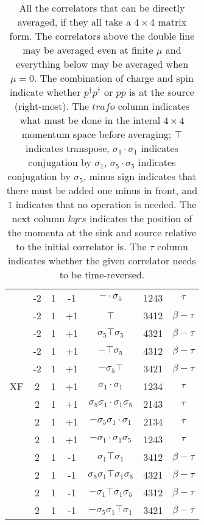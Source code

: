\begin{table}[h]
\begin{tabular}{c|cccccc}
                    & -2 & 1 & -1 & $-\cdot\sigma_5$ & 1243 &  $\tau$  \\
                    & -2 & 1 & +1 & $\top$ & 3412 &  $\beta-\tau$  \\
                    & -2 & 1 & +1 & $\sigma_5\top\sigma_5$ & 4321 &  $\beta-\tau$  \\
                    & -2 & 1 & +1 & $-\top\sigma_5$ & 4312 &  $\beta-\tau$  \\
                    & -2 & 1 & +1 & $-\sigma_5\top$ & 3421 &  $\beta-\tau$  \\
  \hline
  XF                & 2 & 1 & +1 & $\sigma_1\cdot\sigma_1$ & 1234 &  $\tau$  \\
                    & 2 & 1 & +1 & $\sigma_5\sigma_1\cdot\sigma_1\sigma_5$ & 2143 &  $\tau$  \\
                    & 2 & 1 & +1 & $-\sigma_5\sigma_1\cdot\sigma_1$ & 2134 &  $\tau$  \\
                    & 2 & 1 & +1 & $-\sigma_1\cdot\sigma_1\sigma_5$ & 1243 &  $\tau$  \\
                    & 2 & 1 & -1 & $\sigma_1\top\sigma_1$ & 3412 &  $\beta-\tau$  \\
                    & 2 & 1 & -1 & $\sigma_5\sigma_1\top\sigma_1\sigma_5$ & 4321 &  $\beta-\tau$  \\
                    & 2 & 1 & -1 & $-\sigma_1\top\sigma_1\sigma_5$ & 4312 &  $\beta-\tau$  \\
                    & 2 & 1 & -1 & $-\sigma_5\sigma_1\top\sigma_1$ & 3421 &  $\beta-\tau$  \\
  \end{tabular}
  \caption{All the correlators that can be directly averaged, if they all take a $4 \times 4$ matrix form. The correlators above the double line may be averaged even at finite $\mu$ and everything below may be averaged when $\mu = 0$. The combination of charge and spin indicate whether $p^\dagger p^\dagger$ or $pp$ is at the source (right-most). The $trafo$ column indicates what must be done in the interal $4 \times 4$ momentum space before averaging; $\top$ indicates transpose, $\sigma_1\cdot\sigma_1$ indicates conjugation by $\sigma_1$, $\sigma_5\cdot\sigma_5$ indicates conjugation by $\sigma_5$, minus sign indicates that there must be added one minus in front, and $1$ indicates that no operation is needed. The next column $kqrs$ indicates the position of the momenta at the sink and source relative to the initial correlator is. The $\tau$ column indicates whether the given correlator needs to be time-reversed.}
  \label{tab:pppp}
\end{table}